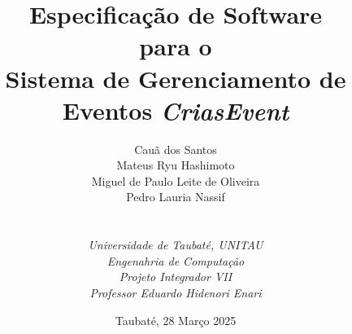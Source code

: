 
\def\Company{Universidade de Taubaté}
\def\Institute{\textit{Universidade de Taubaté, UNITAU}}
\def\Course{\textit{Engenahria de Computação}}
\def\Module{\textit{Projeto Integrador VII}}
\def\Docent{\textit{Professor Eduardo Hidenori Enari}}
\def\Assistant{\textit{}}

\def\BoldTitle{Especificação de Software}

\def\Subtitle{para o \\ Sistema de Gerenciamento de Eventos \textit{CriasEvent} \\}
\def\Authors{Cauã dos Santos \\ Mateus Ryu Hashimoto \\ Miguel de Paulo Leite de Oliveira \\ Pedro Lauria Nassif } 
\def\Shortname{}

\title{\textbf{\BoldTitle}\\\Subtitle}
\author{\Authors \\ \\ \\ \Institute\\ \Course\\ \Module\\ \Docent\\ \Assistant}
\date{Taubaté, 28 Março 2025}


